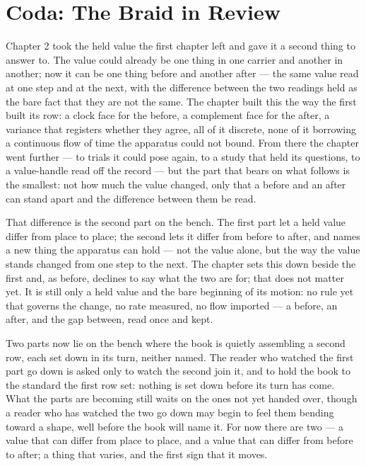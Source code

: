 \section*{Coda: The Braid in Review}

Chapter 2 took the held value the first chapter left and gave it a second thing to answer to. The value could already be one thing in one carrier and another in another; now it can be one thing before and another after --- the same value read at one step and at the next, with the difference between the two readings held as the bare fact that they are not the same. The chapter built this the way the first built its row: a clock face for the before, a complement face for the after, a variance that registers whether they agree, all of it discrete, none of it borrowing a continuous flow of time the apparatus could not bound. From there the chapter went further --- to trials it could pose again, to a study that held its questions, to a value-handle read off the record --- but the part that bears on what follows is the smallest: not how much the value changed, only that a before and an after can stand apart and the difference between them be read.

That difference is the second part on the bench. The first part let a held value differ from place to place; the second lets it differ from before to after, and names a new thing the apparatus can hold --- not the value alone, but the way the value stands changed from one step to the next. The chapter sets this down beside the first and, as before, declines to say what the two are for; that does not matter yet. It is still only a held value and the bare beginning of its motion: no rule yet that governs the change, no rate measured, no flow imported --- a before, an after, and the gap between, read once and kept.

Two parts now lie on the bench where the book is quietly assembling a second row, each set down in its turn, neither named. The reader who watched the first part go down is asked only to watch the second join it, and to hold the book to the standard the first row set: nothing is set down before its turn has come. What the parts are becoming still waits on the ones not yet handed over, though a reader who has watched the two go down may begin to feel them bending toward a shape, well before the book will name it. For now there are two --- a value that can differ from place to place, and a value that can differ from before to after; a thing that varies, and the first sign that it moves.
